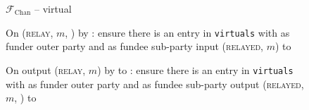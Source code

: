 \begin{figure}[H]
\begin{systembox}{$\mathcal{F}_{\mathrm{Chan}}$ -- virtual}
\begin{algorithmic}[1]
      \State On (\textsc{relay}, $m$, \charlie) by \alice:
      \Indent
        \State ensure there is an entry in \texttt{virtuals} with \alice as funder
        outer party and \charlie as fundee sub-party
        \label{code:functionality:chan:skeleton:virtual:relay:input:start}
        \State input (\textsc{relayed}, $m$) to \charlie
        \label{code:functionality:chan:skeleton:virtual:relay:input:end}
      \EndIndent
      \Statex

      \State On output (\textsc{relay}, $m$) by \charlie to \alice:
      \Indent
        \State ensure there is an entry in \texttt{virtuals} with \alice as funder
        outer party and \charlie as fundee sub-party 
        \label{code:functionality:chan:skeleton:virtual:relay:output:start}
        \State output (\textsc{relayed}, $m$, \charlie) to \environment
        \label{code:functionality:chan:skeleton:virtual:relay:output:end}
      \EndIndent
    \end{algorithmic}
  \end{systembox}
  \caption{}
  \label{code:functionality:chan:skeleton:virtual}
\end{figure}
